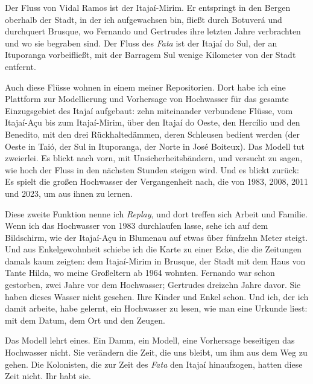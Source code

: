\documentclass[
  ngerman,
  11pt,
  openany]{book}
\begin{document}
Der Fluss von Vidal Ramos ist der Itajaí-Mirim. Er entspringt in den
Bergen oberhalb der Stadt, in der ich aufgewachsen bin, fließt durch
Botuverá und durchquert Brusque, wo Fernando und Gertrudes ihre letzten
Jahre verbrachten und wo sie begraben sind. Der Fluss des \emph{Fata}
ist der Itajaí do Sul, der an Ituporanga vorbeifließt, mit der Barragem
Sul wenige Kilometer von der Stadt entfernt.

Auch diese Flüsse wohnen in einem meiner Repositorien. Dort habe ich
eine Plattform zur Modellierung und Vorhersage von Hochwasser für das
gesamte Einzugsgebiet des Itajaí aufgebaut: zehn miteinander verbundene
Flüsse, vom Itajaí-Açu bis zum Itajaí-Mirim, über den Itajaí do Oeste,
den Hercílio und den Benedito, mit den drei Rückhaltedämmen, deren
Schleusen bedient werden (der Oeste in Taió, der Sul in Ituporanga, der
Norte in José Boiteux). Das Modell tut zweierlei. Es blickt nach vorn,
mit Unsicherheitsbändern, und versucht zu sagen, wie hoch der Fluss in
den nächsten Stunden steigen wird. Und es blickt zurück: Es spielt die
großen Hochwasser der Vergangenheit nach, die von 1983, 2008, 2011 und
2023, um aus ihnen zu lernen.

Diese zweite Funktion nenne ich \emph{Replay}, und dort treffen sich
Arbeit und Familie. Wenn ich das Hochwasser von 1983 durchlaufen lasse,
sehe ich auf dem Bildschirm, wie der Itajaí-Açu in Blumenau auf etwas
über fünfzehn Meter steigt. Und aus Enkelgewohnheit schiebe ich die
Karte zu einer Ecke, die die Zeitungen damals kaum zeigten: dem
Itajaí-Mirim in Brusque, der Stadt mit dem Haus von Tante Hilda, wo
meine Großeltern ab 1964 wohnten. Fernando war schon gestorben, zwei
Jahre vor dem Hochwasser; Gertrudes dreizehn Jahre davor. Sie haben
dieses Wasser nicht gesehen. Ihre Kinder und Enkel schon. Und ich, der
ich damit arbeite, habe gelernt, ein Hochwasser zu lesen, wie man eine
Urkunde liest: mit dem Datum, dem Ort und den Zeugen.

Das Modell lehrt eines. Ein Damm, ein Modell, eine Vorhersage beseitigen
das Hochwasser nicht. Sie verändern die Zeit, die uns bleibt, um ihm aus
dem Weg zu gehen. Die Kolonisten, die zur Zeit des \emph{Fata} den
Itajaí hinaufzogen, hatten diese Zeit nicht. Ihr habt sie.
\end{document}
